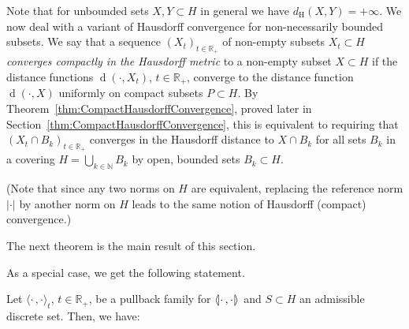 \documentclass[AHL,Unicode,longabstracts]{cedram}
\makeatletter
\newcommand{\innone}[2]{{\langle#2\rangle_{#1}}}
\newcommand{\llangle}{\mathopen{\langle\mkern -3.1mu\lvert}}
\newcommand{\rrangle}{\mathclose{\rvert\mkern -3.1mu\rangle}}
\newcommand{\highinn}[2]{{\llangle#2\rrangle_{#1}}}
\newcommand{\refnorm}[1]{\lvert#1\rvert}
\DeclareMathOperator{\Vor}{Vor}
\DeclareMathOperator{\dist}{d}
\newcommand{\R}{\mathbb{R}}
\newcommand{\N}{\mathbb{N}}
\newcommand{\hdist}{d_{\mathrm{H}}}
\renewcommand*{\to}{\mathchoice{\longrightarrow}{\rightarrow}{\rightarrow}{\rightarrow}}
\let\save@mathaccent\mathaccent
\newcommand*\if@single[3]{%
  \setbox0\hbox{${\mathaccent"0362{#1}}^H$}%
  \setbox2\hbox{${\mathaccent"0362{\kern0pt#1}}^H$}%
  \ifdim\ht0=\ht2 #3\else #2\fi
  }
\newcommand*\rel@kern[1]{\kern#1\dimexpr\macc@kerna}
\newcommand*\widebar[1]{\@ifnextchar^{{\wide@bar{#1}{0}}}{\wide@bar{#1}{1}}}
\newcommand*\wide@bar[2]{\if@single{#1}{\wide@bar@{#1}{#2}{1}}{\wide@bar@{#1}{#2}{2}}}
\newcommand*\wide@bar@[3]{%
  \begingroup
  \def\mathaccent##1##2{%
    \let\mathaccent\save@mathaccent
    \if#32 \let\macc@nucleus\first@char \fi
    \setbox\z@\hbox{$\macc@style{\macc@nucleus}_{}$}%
    \setbox\tw@\hbox{$\macc@style{\macc@nucleus}{}_{}$}%
    \dimen@\wd\tw@
    \advance\dimen@-\wd\z@
    \divide\dimen@ 3
    \@tempdima\wd\tw@
    \advance\@tempdima-\scriptspace
    \divide\@tempdima 10
    \advance\dimen@-\@tempdima
    \ifdim\dimen@>\z@ \dimen@0pt\fi
    \rel@kern{0.6}\kern-\dimen@
    \if#31
      \overline{\rel@kern{-0.6}\kern\dimen@\macc@nucleus\rel@kern{0.4}\kern\dimen@}%
      \advance\dimen@0.4\dimexpr\macc@kerna
      \let\final@kern#2%
      \ifdim\dimen@<\z@ \let\final@kern1\fi
      \if\final@kern1 \kern-\dimen@\fi
    \else
      \overline{\rel@kern{-0.6}\kern\dimen@#1}%
    \fi
  }%
  \macc@depth\@ne
  \let\math@bgroup\@empty \let\math@egroup\macc@set@skewchar
  \mathsurround\z@ \frozen@everymath{\mathgroup\macc@group\relax}%
  \macc@set@skewchar\relax
  \let\mathaccentV\macc@nested@a
  \if#31
    \macc@nested@a\relax111{#1}%
  \else
    \def\gobble@till@marker##1\endmarker{}%
    \futurelet\first@char\gobble@till@marker#1\endmarker
    \ifcat\noexpand\first@char A\else
      \def\first@char{}%
    \fi
    \macc@nested@a\relax111{\first@char}%
  \fi
  \endgroup
}
\let\oldbar\bar
\renewcommand*{\bar}[1]{{\mathchoice{\widebar{#1}}{\widebar{#1}}{\widebar{#1}}{\oldbar{#1}}}}
\makeatother
\begin{document}
Note that for unbounded sets $X,Y \subset H$ in general we have $\hdist(X,Y) = + \infty$. We now deal with a variant of Hausdorff convergence for non-necessarily bounded subsets. We say that a sequence $(X_t)_{t \in \R_+}$ of non-empty subsets $X_t \subset H$ \emph{converges compactly in the Hausdorff metric} to a non-empty subset $X \subset H$ if the distance functions $\dist(\cdot, X_t)$, $t\in \R_+$, converge to the distance function $\dist(\cdot, X)$ uniformly on compact subsets $P \subset H$. By Theorem~\ref{thm:CompactHausdorffConvergence}, proved later in Section~\ref{thm:CompactHausdorffConvergence}, this is equivalent to requiring that $(X_t\cap B_k)_{t\in \R_+}$ converges in the Hausdorff distance to $X \cap B_k$ for all sets $B_k$ in a covering $H = \bigcup_{k\in \N} B_k$ by open, bounded sets $B_k \subset H$.


(Note that since any two norms on $H$ are equivalent, replacing the reference norm $\refnorm{\cdot}$ by another norm on $H$ leads to the same notion of Hausdorff (compact) convergence.)



The next theorem is the main result of this section.



As a special case, we get the following statement.

\begin{coro} Let $\innone{t}{\cdot\,, \cdot}$, $t\in \R_+$, be a pullback family for $\highinn{}{\cdot\,,\cdot}$ and $S\subset H$ an admissible discrete set. Then, we have:
\end{coro}
\end{document}
